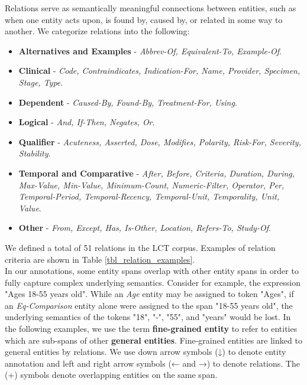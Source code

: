\documentclass[fleqn,10pt]{wlscirep}
\begin{document}
\noindent Relations serve as semantically meaningful connections between entities, such as when one entity acts upon, is found by, caused by, or related in some way to another. We categorize relations into the following:
\begin{itemize}
    \item \textbf{Alternatives and Examples} - \textit{Abbrev-Of, Equivalent-To, Example-Of}. %
    \item \textbf{Clinical} - \textit{Code, Contraindicates, Indication-For, Name, Provider, Specimen, Stage, Type}. %
    \item \textbf{Dependent} - \textit{Caused-By, Found-By, Treatment-For, Using}. %
    \item \textbf{Logical} - \textit{And, If-Then, Negates, Or}. %
    \item \textbf{Qualifier} - \textit{Acuteness, Asserted, Dose, Modifies, Polarity, Risk-For, Severity, Stability}.
    \item \textbf{Temporal and Comparative} - \textit{After, Before, Criteria, Duration, During, Max-Value, Min-Value, Minimum-Count, Numeric-Filter, Operator, Per, Temporal-Period, Temporal-Recency, Temporal-Unit, Temporality, Unit, Value}.
    \item \textbf{Other} - \textit{From, Except, Has, Is-Other, Location, Refers-To, Study-Of}.
\end{itemize}

\noindent We defined a total of 51 relations in the LCT corpus. Examples of relation criteria are shown in Table \ref{tbl_relation_examples}.  \\

\noindent In our annotations, some entity spans overlap with other entity spans in order to fully capture complex underlying semantics. Consider for example, the expression "Ages 18-55 years old". While an \textit{Age} entity may be assigned to token "Ages", if an \textit{Eq-Comparison} entity alone were assigned to the span "18-55 years old", the underlying semantics of the tokens "18", "-", "55", and "years" would be lost. In the following examples, we use the term \textbf{fine-grained entity} to refer to entities which are sub-spans of other \textbf{general entities}. Fine-grained entities are linked to general entities by relations. We use down arrow symbols (↓) to denote entity annotation and left and right arrow symbols (← and →) to denote relations. The (+) symbols denote overlapping entities on the same span. \\
\end{document}
